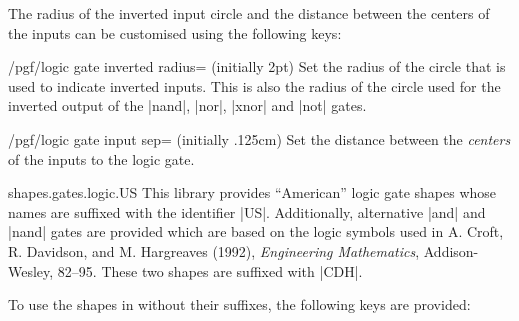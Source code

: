 The radius of the inverted input circle and the distance between the 
centers of the inputs can be customised using the following keys:

\begin{key}{/pgf/logic gate inverted radius= (initially 2pt)}
  Set the radius of the circle that is used to indicate inverted
  inputs. This is also the radius of the circle used for the inverted
  output of the |nand|, |nor|, |xnor| and |not| gates. 
    
\begin{codeexample}[]
\end{codeexample} 
\end{key}

\begin{key}{/pgf/logic gate input sep= (initially .125cm)}
  Set the distance between the \emph{centers} of the inputs to the
  logic gate. 
  
\begin{codeexample}[]
\end{codeexample} 
\end{key}



\begin{pgflibrary}{shapes.gates.logic.US}
  This library provides ``American'' logic gate shapes whose names are 
  suffixed with the identifier |US|. Additionally,
  alternative |and| and |nand| gates are provided which are based on the 
  logic symbols used in A. Croft, R. Davidson, and M. Hargreaves (1992), 
  \emph{Engineering Mathematics}, Addison-Wesley, 82--95. These two 
  shapes are suffixed with |CDH|. 
\end{pgflibrary}

To use the shapes in \tikzname{} without their suffixes, the 
following keys are provided:
  
